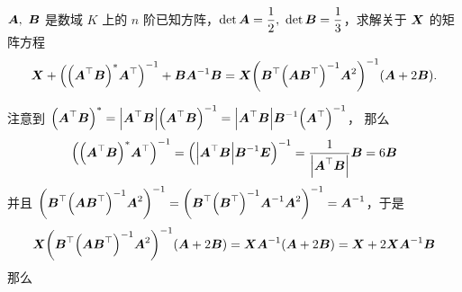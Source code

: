 \begin{example}
    $\vb*{A},~\vb*{B}$ 是数域 $K$ 上的 $n$ 阶已知方阵，$\det \vb*{A}=\dfrac{1}{2},~\det\vb*{B}=\dfrac{1}{3}$，求解关于 $\vb*{X}$ 的矩阵方程
    $$\vb*{X}+\qty(\qty(\vb*{A}^\top\vb*{B})^*\vb*{A}^\top)^{-1}+\vb*{BA}^{-1}\vb*{B}=\vb*{X}\qty(\vb*{B}^\top\qty(\vb*{AB}^\top)^{-1}\vb*{A}^2)^{-1}(\vb*{A}+2\vb*{B}).$$
\end{example}
\begin{solution}
    注意到 $\qty(\vb*{A}^\top\vb*{B})^*=\qty|\vb*{A}^\top\vb*{B}|\qty(\vb*{A}^\top\vb*{B})^{-1}=\qty|\vb*{A}^\top\vb*{B}|\vb*{B}^{-1}\qty(\vb*{A}^\top)^{-1}$，
    那么 $$\qty(\qty(\vb*{A}^\top\vb*{B})^*\vb*{A}^\top)^{-1}=\qty(\qty|\vb*{A}^\top\vb*{B}|\vb*{B}^{-1}\vb*{E})^{-1}=\dfrac{1}{\qty|\vb*{A}^\top\vb*{B}|}\vb*{B}=6\vb*{B}$$
    并且 $\qty(\vb*{B}^\top\qty(\vb*{AB}^\top)^{-1}\vb*{A}^2)^{-1}=\qty(\vb*{B}^\top\qty(\vb*{B}^\top)^{-1}\vb*{A}^{-1}\vb*{A}^2)^{-1}=\vb*{A}^{-1}$，于是
    $$\vb*{X}\qty(\vb*{B}^\top\qty(\vb*{AB}^\top)^{-1}\vb*{A}^2)^{-1}(\vb*{A}+2\vb*{B})=\vb*{X}\vb*{A}^{-1}\qty(\vb*{A}+2\vb*{B})=\vb*{X}+2\vb*{XA}^{-1}\vb*{B}$$
    那么 
\end{solution}

